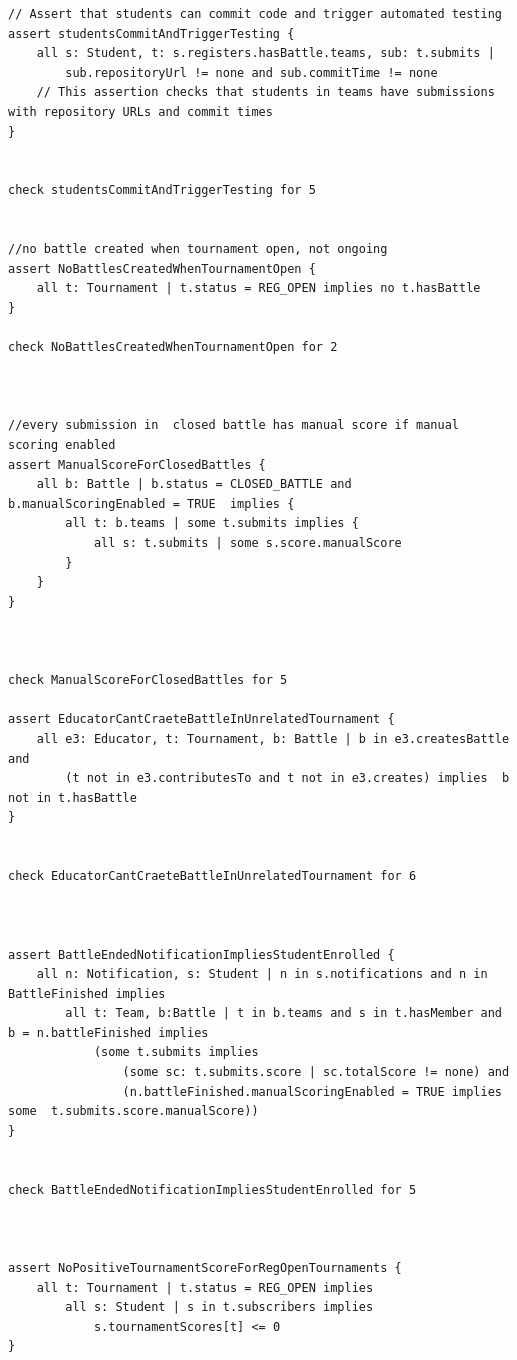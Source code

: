 \begin{lstlisting}[language=alloy]
// Assert that students can commit code and trigger automated testing
assert studentsCommitAndTriggerTesting {
    all s: Student, t: s.registers.hasBattle.teams, sub: t.submits |
        sub.repositoryUrl != none and sub.commitTime != none
    // This assertion checks that students in teams have submissions with repository URLs and commit times
}


check studentsCommitAndTriggerTesting for 5


//no battle created when tournament open, not ongoing
assert NoBattlesCreatedWhenTournamentOpen {
    all t: Tournament | t.status = REG_OPEN implies no t.hasBattle
}

check NoBattlesCreatedWhenTournamentOpen for 2



//every submission in  closed battle has manual score if manual scoring enabled
assert ManualScoreForClosedBattles {
    all b: Battle | b.status = CLOSED_BATTLE and b.manualScoringEnabled = TRUE  implies {
        all t: b.teams | some t.submits implies {
            all s: t.submits | some s.score.manualScore
        }
    }
}



check ManualScoreForClosedBattles for 5

assert EducatorCantCraeteBattleInUnrelatedTournament {
    all e3: Educator, t: Tournament, b: Battle | b in e3.createsBattle	and
        (t not in e3.contributesTo and t not in e3.creates) implies  b not in t.hasBattle
}


check EducatorCantCraeteBattleInUnrelatedTournament for 6



assert BattleEndedNotificationImpliesStudentEnrolled {
    all n: Notification, s: Student | n in s.notifications and n in BattleFinished implies
        all t: Team, b:Battle | t in b.teams and s in t.hasMember and b = n.battleFinished implies
            (some t.submits implies 
                (some sc: t.submits.score | sc.totalScore != none) and 
                (n.battleFinished.manualScoringEnabled = TRUE implies some  t.submits.score.manualScore))
}


check BattleEndedNotificationImpliesStudentEnrolled for 5



assert NoPositiveTournamentScoreForRegOpenTournaments {
    all t: Tournament | t.status = REG_OPEN implies
        all s: Student | s in t.subscribers implies
            s.tournamentScores[t] <= 0
}


\end{lstlisting}
